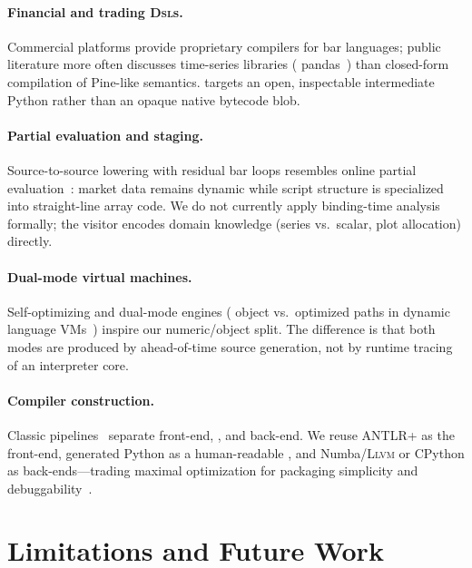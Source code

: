 \documentclass[11pt,a4paper]{article}
\newcommand{\llvm}{\textsc{Llvm}}
\begin{document}
\paragraph{Financial and trading \textsc{Dsl}s.}
Commercial platforms provide proprietary compilers for bar languages; public
literature more often discusses time-series libraries
(\eg{} pandas~\citep{brooks2015python}) than closed-form compilation of
Pine-like semantics. \pyne{} targets an open, inspectable intermediate Python
\ir{} rather than an opaque native bytecode blob.

\paragraph{Partial evaluation and staging.}
Source-to-source lowering with residual bar loops resembles online partial
evaluation~\citep{jones1993partial}: market data remains dynamic while script
structure is specialized into straight-line array code. We do not currently
apply binding-time analysis formally; the visitor encodes domain knowledge
(series vs.\ scalar, plot allocation) directly.

\paragraph{Dual-mode virtual machines.}
Self-optimizing and dual-mode engines (\eg{} object vs.\ optimized paths in
dynamic language VMs~\citep{chambers1991iterative}) inspire our
numeric/object split. The difference is that both modes are produced by
ahead-of-time source generation, not by runtime tracing of an interpreter
core.

\paragraph{Compiler construction.}
Classic pipelines~\citep{aho2006dragon,cooper2011engineering} separate
front-end, \ir{}, and back-end. We reuse ANTLR+\asdl{} as the front-end,
generated Python as a human-readable \ir{}, and Numba/\llvm{} or CPython as
back-ends---trading maximal optimization for packaging simplicity and
debuggability~\citep{leroy2009formal}.

\section{Limitations and Future Work}
\label{sec:limits}
\end{document}
